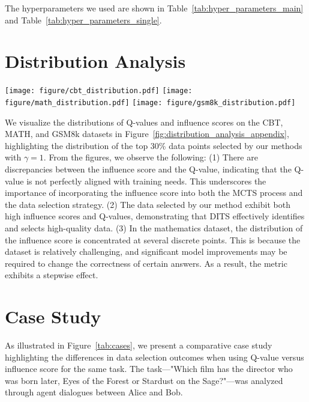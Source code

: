  The hyperparameters we used are shown in Table~\ref{tab:hyper_parameters_main} and Table~\ref{tab:hyper_parameters_single}.





\section{Distribution Analysis}

\begin{figure*}
    \centering
    \texttt{[image: figure/cbt\_distribution.pdf]}
    \texttt{[image: figure/math\_distribution.pdf]}
    \texttt{[image: figure/gsm8k\_distribution.pdf]}
    \caption{The scatter plot and density plots of Q-values and influence scores for synthetic data. The top 30\% of the data selected by DITS is highlighted in red.}
    \label{fig:distribution_analysis_appendix}
\end{figure*}

We visualize the distributions of Q-values and influence scores on the CBT, MATH, and GSM8k datasets in Figure~\ref{fig:distribution_analysis_appendix}, highlighting the distribution of the top 30\% data points selected by our methods with $\gamma=1$. From the figures, we observe the following: (1) There are discrepancies between the influence score and the Q-value, indicating that the Q-value is not perfectly aligned with training needs. This underscores the importance of incorporating the influence score into both the MCTS process and the data selection strategy. (2) The data selected by our method exhibit both high influence scores and Q-values, demonstrating that DITS effectively identifies and selects high-quality data. (3) In the mathematics dataset, the distribution of the influence score is concentrated at several discrete points. This is because the dataset is relatively challenging, and significant model improvements may be required to change the correctness of certain answers. As a result, the metric exhibits a stepwise effect.


\section{Case Study}

As illustrated in Figure~\ref{tab:cases}, we present a comparative case study highlighting the differences in data selection outcomes when using Q-value versus influence score for the same task. The task—"Which film has the director who was born later, Eyes of the Forest or Stardust on the Sage?"—was analyzed through agent dialogues between Alice and Bob.  

